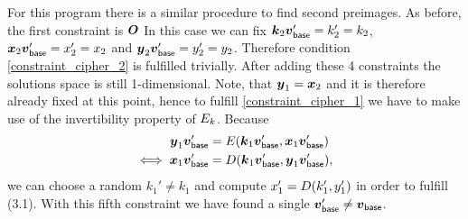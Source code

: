 \begin{pchstack}[center, space=2cm]
\end{pchstack}
For this program there is a similar procedure to find second preimages.
As before, the first constraint is $\boldsymbol{O} $
In this case we can fix $\boldsymbol k_2 \boldsymbol v_{\mathsf{base}}' = k_2' = k_2$, $\boldsymbol x_2 \boldsymbol v_{\mathsf{base}}' = x_2' = x_2$ and $\boldsymbol y_2 \boldsymbol v_{\mathsf{base}}' = y_2' = y_2$.
Therefore condition \eqref{constraint_cipher_2} is fulfilled trivially.
After adding these 4 constraints the solutions space is still 1-dimensional.
Note, that $\boldsymbol y_1 = \boldsymbol x_2$ and it is therefore already fixed at this point,
hence to fulfill \eqref{constraint_cipher_1} we have to make use of the invertibility property of $E_k$.
Because
\begin{align*}
    \boldsymbol y_1 \boldsymbol v_{\mathsf{base}}' &= E(\boldsymbol k_1 \boldsymbol v_{\mathsf{base}}', \boldsymbol x_1 \boldsymbol v_{\mathsf{base}}') \\
    \iff \boldsymbol x_1 \boldsymbol v_{\mathsf{base}}' &= D(\boldsymbol k_1 \boldsymbol v_{\mathsf{base}}', \boldsymbol y_1 \boldsymbol v_{\mathsf{base}}'),
\end{align*}
we can choose a random $k_1' \neq k_1$ and compute $x_1' = D(k_1', y_1')$ in order to fulfill (3.1).
With this fifth constraint we have found a single $\boldsymbol v_{\mathsf{base}}' \neq \boldsymbol v_{\mathsf{base}}$.

